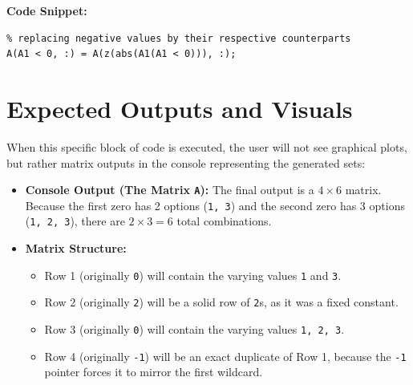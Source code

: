 \textbf{Code Snippet:}
\begin{lstlisting}
% replacing negative values by their respective counterparts
A(A1 < 0, :) = A(z(abs(A1(A1 < 0))), :);
\end{lstlisting}

\newpage
\section{Expected Outputs and Visuals}

When this specific block of code is executed, the user will not see graphical plots, but rather matrix outputs in the console representing the generated sets:

\begin{itemize}
    \item \textbf{Console Output (The Matrix \texttt{A}):} The final output is a $4 \times 6$ matrix. Because the first zero has 2 options (\texttt{1, 3}) and the second zero has 3 options (\texttt{1, 2, 3}), there are $2 \times 3 = 6$ total combinations. 
    \item \textbf{Matrix Structure:} 
    \begin{itemize}
        \item Row 1 (originally \texttt{0}) will contain the varying values \texttt{1} and \texttt{3}.
        \item Row 2 (originally \texttt{2}) will be a solid row of \texttt{2}s, as it was a fixed constant.
        \item Row 3 (originally \texttt{0}) will contain the varying values \texttt{1, 2, 3}.
        \item Row 4 (originally \texttt{-1}) will be an exact duplicate of Row 1, because the \texttt{-1} pointer forces it to mirror the first wildcard.
    \end{itemize}
\end{itemize}


